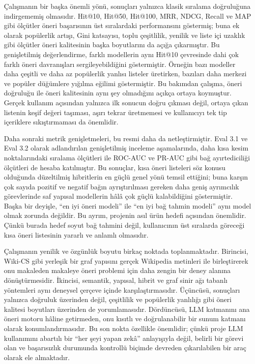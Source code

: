 Çalışmanın bir başka önemli yönü, sonuçları yalnızca klasik sıralama
doğruluğuna indirgememiş olmasıdır. Hit@10, Hit@50, Hit@100, MRR, NDCG, Recall
ve MAP gibi ölçütler öneri başarısının üst sıralardaki performansını göstermiş;
buna ek olarak popülerlik artışı, Gini katsayısı, toplu çeşitlilik, yenilik ve
liste içi uzaklık gibi ölçütler öneri kalitesinin başka boyutlarını da açığa
çıkarmıştır. Bu genişletilmiş değerlendirme, farklı modellerin aynı Hit@10
çevresinde dahi çok farklı öneri davranışları sergileyebildiğini göstermiştir.
Örneğin bazı modeller daha çeşitli ve daha az popülerlik yanlısı listeler
üretirken, bazıları daha merkezi ve popüler düğümlere yığılma eğilimi
göstermiştir. Bu bakımdan çalışma, öneri doğruluğu ile öneri kalitesinin aynı
şey olmadığını açıkça ortaya koymuştur. Gerçek kullanım açısından yalnızca ilk
sonucun doğru çıkması değil, ortaya çıkan listenin keşif değeri taşıması,
aşırı tekrar üretmemesi ve kullanıcıyı tek tip içeriklere sıkıştırmaması da
önemlidir.

Daha sonraki metrik genişletmeleri, bu resmi daha da netleştirmiştir. Eval 3.1
ve Eval 3.2 olarak adlandırılan genişletilmiş inceleme aşamalarında, daha kısa
kesim noktalarındaki sıralama ölçütleri ile ROC-AUC ve PR-AUC gibi bağ
ayırtediciliği ölçütleri de hesaba katılmıştır. Bu sonuçlar, kısa öneri
listeleri söz konusu olduğunda düzeltilmiş hibritlerin en güçlü genel yönü
temsil ettiğini; buna karşın çok sayıda pozitif ve negatif bağın ayrıştırılması
gereken daha geniş ayrımcılık görevlerinde saf yapısal modellerin hâlâ çok
güçlü kalabildiğini göstermiştir. Başka bir deyişle, “en iyi öneri modeli” ile
“en iyi bağ tahmin modeli” aynı model olmak zorunda değildir. Bu ayrım, projenin
asıl ürün hedefi açısından önemlidir. Çünkü burada hedef soyut bağ tahmini
değil, kullanıcının üst sıralarda göreceği kısa öneri listesinin yararlı ve
anlamlı olmasıdır.

Çalışmanın yenilik ve özgünlük boyutu birkaç noktada toplanmaktadır.
Birincisi, Wiki-CS gibi yerleşik bir graf yapısını gerçek Wikipedia metinleri
ile birleştirerek onu makaleden makaleye öneri problemi için daha zengin bir
deney alanına dönüştürmesidir. İkincisi, semantik, yapısal, hibrit ve graf
sinir ağı tabanlı yöntemleri aynı deneysel çerçeve içinde karşılaştırmasıdır.
Üçüncüsü, sonuçları yalnızca doğruluk üzerinden değil, çeşitlilik ve
popülerlik yanlılığı gibi öneri kalitesi boyutları üzerinden de yorumlamasıdır.
Dördüncüsü, LLM katmanını ana öneri motoru hâline getirmeden, onu kısıtlı ve
doğrulanabilir bir sunum katmanı olarak konumlandırmasıdır. Bu son nokta
özellikle önemlidir; çünkü proje LLM kullanımını abartılı bir “her şeyi yapan
zekâ” anlayışıyla değil, belirli bir görevi olan ve başarısızlık durumunda
kontrollü biçimde devreden çıkarılabilen bir araç olarak ele almaktadır.

